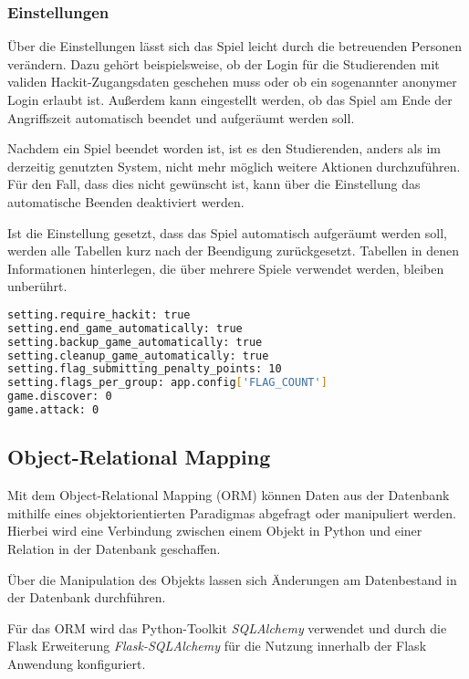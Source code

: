 \subsubsection{Einstellungen} \label{subsub:realisierung-settings}
Über die Einstellungen lässt sich das Spiel leicht durch die betreuenden Personen verändern.
Dazu gehört beispielsweise, ob der Login für die Studierenden mit validen Hackit-Zugangsdaten geschehen muss oder ob ein sogenannter anonymer Login erlaubt ist. Außerdem kann eingestellt werden, ob das Spiel am Ende der Angriffszeit automatisch beendet und aufgeräumt werden soll. 

Nachdem ein Spiel beendet worden ist, ist es den Studierenden, anders als im derzeitig genutzten System, nicht mehr möglich weitere Aktionen durchzuführen. Für den Fall, dass dies nicht gewünscht ist, kann über die Einstellung das automatische Beenden deaktiviert werden.

Ist die Einstellung gesetzt, dass das Spiel automatisch aufgeräumt werden soll, werden alle Tabellen kurz nach der Beendigung zurückgesetzt. Tabellen in denen Informationen hinterlegen, die über mehrere Spiele verwendet werden, bleiben unberührt.

\begin{lstlisting}[language=bash, frame=single, caption={GIS Auszug aus den Einstellungen}, captionpos=b, label={lst:gis-settings}]
setting.require_hackit: true
setting.end_game_automatically: true
setting.backup_game_automatically: true
setting.cleanup_game_automatically: true
setting.flag_submitting_penalty_points: 10
setting.flags_per_group: app.config['FLAG_COUNT']
game.discover: 0
game.attack: 0
\end{lstlisting}

\subsection{Object-Relational Mapping}
Mit dem Object-Relational Mapping (ORM) können Daten aus der Datenbank mithilfe eines objektorientierten Paradigmas abgefragt oder manipuliert werden. Hierbei wird eine Verbindung zwischen einem Objekt in Python und einer Relation in der Datenbank geschaffen.

Über die Manipulation des Objekts lassen sich Änderungen am Datenbestand in der Datenbank durchführen. 

Für das ORM wird das Python-Toolkit \textit{SQLAlchemy} verwendet und durch die Flask Erweiterung \textit{Flask-SQLAlchemy} für die Nutzung innerhalb der Flask Anwendung konfiguriert. 

